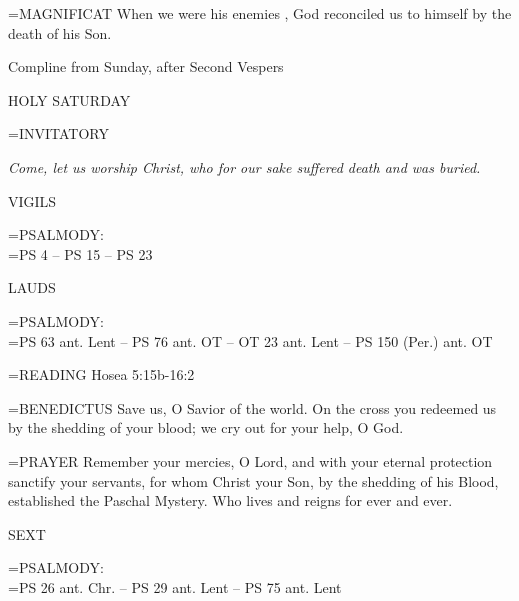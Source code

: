 \hangindent=\parindent \small{MAGNIFICAT 	When we were his enemies , God reconciled us to himself by the death of his Son.\\}

Compline from Sunday, after Second Vespers

HOLY SATURDAY

\hangindent=\parindent \small{INVITATORY}
\begin{center}
\textit{Come, let us worship Christ, who for our sake suffered death and was buried.\\}
\end{center}

\begin{flushleft}\normalsize VIGILS\\\end{flushleft}

\hangindent=\parindent \small{PSALMODY:}\\
\hangindent=\parindent  PS 4 -- PS 15 -- PS 23\vspace{0.5em}

\begin{flushleft}\normalsize LAUDS\\\end{flushleft}

\hangindent=\parindent \small{PSALMODY:}\\
\hangindent=\parindent  PS 63 ant. Lent -- PS 76 ant. OT -- OT 23 ant. Lent -- PS 150 (Per.) ant. OT\vspace{0.5em}

\hangindent=\parindent \small{\uppercase{READING}}    Hosea 5:15b-16:2 \textbf{   \\}

\hangindent=\parindent \small{BENEDICTUS 	Save us, O Savior of the world. On the cross you redeemed us by the shedding of your blood; we cry out for your help, O God.\\}

\hangindent=\parindent \small{PRAYER 	Remember your mercies, O Lord, and with your eternal protection sanctify your servants, for whom Christ your Son, by the shedding of his Blood, established the Paschal Mystery. Who lives and reigns for ever and ever.}

\begin{flushleft}\normalsize SEXT\\\end{flushleft}

\hangindent=\parindent \small{PSALMODY:}\\
\hangindent=\parindent  PS 26 ant. Chr. -- PS 29 ant. Lent -- PS 75 ant. Lent\vspace{0.5em}

